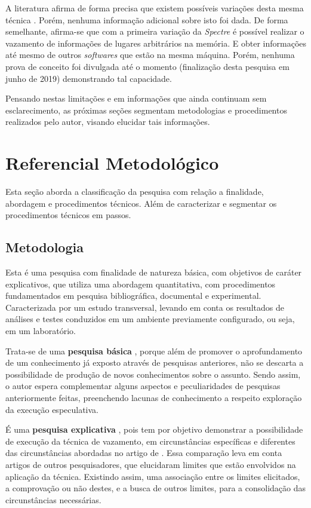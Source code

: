 \documentclass[
	article,			    %
	12pt,				    %
	oneside,			    %
	a4paper,			    %
	chapter=TITLE,		    %
	section=TITLE,		    %
	subsection=TITLE,	    %
	english,			    %
	brazil,				    %
	sumario=tradicional
]{abntex2}
\begin{document}
A literatura afirma de forma precisa que existem possíveis variações desta mesma técnica \cite{Kocher2018Spectre}. Porém, nenhuma informação adicional sobre isto foi dada. De forma semelhante, afirma-se que com a primeira variação da \emph{Spectre} é possível realizar o vazamento de informações de lugares arbitrários na memória. E obter informações até mesmo de outros \emph{softwares} que estão na mesma máquina. Porém, nenhuma prova de conceito foi divulgada até o momento (finalização desta pesquisa em junho de 2019) demonstrando tal capacidade.

Pensando nestas limitações e em informações que ainda continuam sem esclarecimento, as próximas seções segmentam metodologias e procedimentos realizados pelo autor, visando elucidar tais informações.

\section{Referencial Metodológico}
Esta seção aborda a classificação da pesquisa com relação a finalidade, abordagem e procedimentos técnicos. Além de caracterizar e segmentar os procedimentos técnicos em passos.
\subsection{Metodologia}
Esta é uma pesquisa com finalidade de natureza básica, com objetivos de caráter explicativos, que utiliza uma abordagem quantitativa, com procedimentos fundamentados em pesquisa bibliográfica, documental e experimental. Caracterizada por um estudo transversal, levando em conta os resultados de análises e testes conduzidos em um ambiente previamente configurado, ou seja, em um laboratório.

Trata-se de uma \textbf{pesquisa básica} \cite{Priscilla2017Metodologia}, porque além de promover o aprofundamento de um conhecimento já exposto através de pesquisas anteriores, não se descarta a possibilidade de produção de novos conhecimentos sobre o assunto. Sendo assim, o autor espera complementar alguns aspectos e peculiaridades de pesquisas anteriormente feitas, preenchendo lacunas de conhecimento a respeito exploração da execução especulativa.

É uma \textbf{pesquisa explicativa} \cite{Rocha2016Dom}, pois tem por objetivo demonstrar a possibilidade de execução da técnica de vazamento, em circunstâncias específicas e diferentes das circunstâncias abordadas no artigo de . Essa comparação leva em conta artigos de outros pesquisadores, que elucidaram limites que estão envolvidos na aplicação da técnica. Existindo assim, uma associação entre os limites elicitados, a comprovação ou não destes, e a busca de outros limites, para a consolidação das circunstâncias necessárias.
\end{document}
